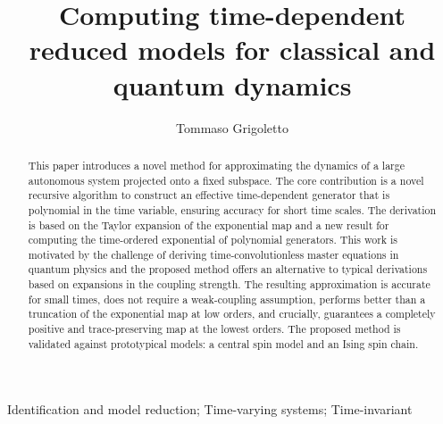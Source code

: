 \documentclass[twocolumn]{autart}    %
\begin{document}
\begin{frontmatter}
\title{Computing time-dependent reduced models for classical and quantum dynamics} %


\author[unipd]{Tommaso Grigoletto}
\address[unipd]{Department of Information Engineering, University of Padova, Italy}  
          
\begin{keyword}                           %
Identification and model reduction; Time-varying systems; Time-invariant               %
\end{keyword}                             %


\begin{abstract}                          %
    This paper introduces a novel method for approximating the dynamics of a large autonomous system projected onto a fixed subspace. The core contribution is a novel recursive algorithm to construct an effective time-dependent generator that is polynomial in the time variable, ensuring accuracy for short time scales. The derivation is based on the Taylor expansion of the exponential map and a new result for computing the time-ordered exponential of polynomial generators.
    This work is motivated by the challenge of deriving time-convolutionless master equations in quantum physics and the proposed method offers an alternative to typical derivations based on expansions in the coupling strength. 
    The resulting approximation is accurate for small times, does not require a weak-coupling assumption, performs better than a truncation of the exponential map at low orders, and crucially, guarantees a completely positive and trace-preserving map at the lowest orders. The proposed method is validated against prototypical models: a central spin model and an Ising spin chain.
\end{abstract}

\end{frontmatter}
\end{document}
